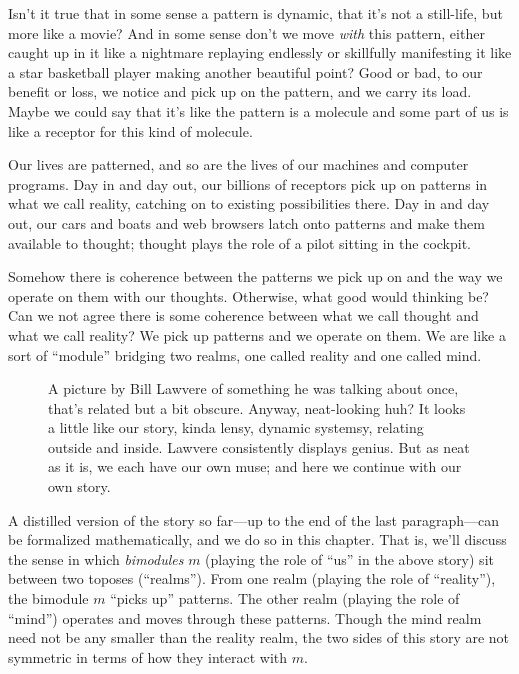 \documentclass[DynamicalBook]{subfiles}
\begin{document}
Isn't it true that in some sense a pattern is dynamic, that it's not a still-life, but more like a movie? And in some sense don't we move \emph{with} this pattern, either caught up in it like a nightmare replaying endlessly or skillfully manifesting it like a star basketball player making another beautiful point? Good or bad, to our benefit or loss, we notice and pick up on the pattern, and we carry its load. Maybe we could say that it's like the pattern is a molecule and some part of us is like a receptor for this kind of molecule.

Our lives are patterned, and so are the lives of our machines and computer programs. Day in and day out, our billions of receptors pick up on patterns in what we call reality, catching on to existing possibilities there. Day in and day out, our cars and boats and web browsers latch onto patterns and make them available to thought; thought plays the role of a pilot sitting in the cockpit.

Somehow there is coherence between the patterns we pick up on and the way we operate on them with our thoughts. Otherwise, what good would thinking be? Can we not agree there is some coherence between what we call thought and what we call reality? We pick up patterns and we operate on them. We are like a sort of ``module'' bridging two realms, one called reality and one called mind. 

\begin{figure}
\caption{A picture by Bill Lawvere of something he was talking about once, that's related but a bit obscure. Anyway, neat-looking huh? It looks a little like our story, kinda lensy, dynamic systemsy, relating outside and inside. Lawvere consistently displays genius. But as neat as it is, we each have our own muse; and here we continue with our own story. }
\end{figure}

A distilled version of the story so far---up to the end of the last paragraph---can be formalized mathematically, and we do so in this chapter. That is, we'll discuss the sense in which \emph{bimodules} $m$ (playing the role of ``us'' in the above story) sit between two toposes (``realms''). From one realm (playing the role of ``reality''), the bimodule $m$ ``picks up'' patterns. The other realm (playing the role of ``mind'') operates and moves through these patterns. Though the mind realm need not be any smaller than the reality realm, the two sides of this story are not symmetric in terms of how they interact with $m$.
\end{document}

